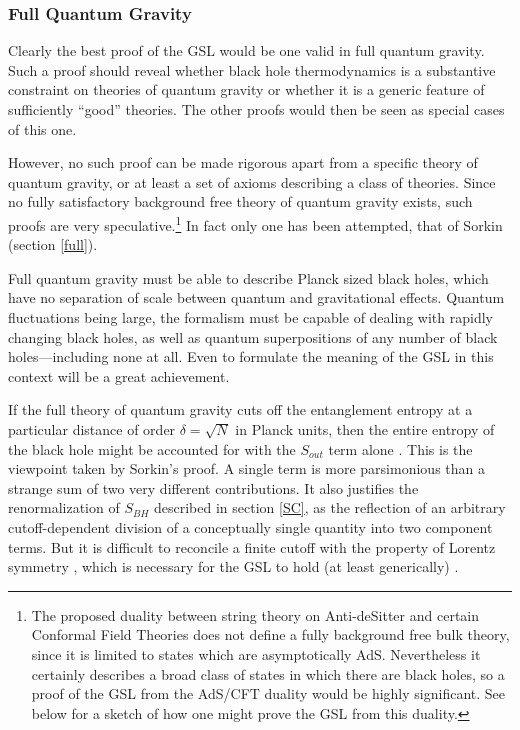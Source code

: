 \documentclass{article}
\begin{document}
\subsubsection{Full Quantum Gravity}\label{QG}

Clearly the best proof of the GSL would be one valid in full quantum gravity.  Such a proof should reveal whether black hole thermodynamics is a substantive constraint on theories of quantum gravity or whether it is a generic feature of sufficiently ``good'' theories.  The other proofs would then be seen as special cases of this one.

However, no such proof can be made rigorous apart from a specific theory of quantum gravity, or at least a set of axioms describing a class of theories.  Since no fully satisfactory background free theory of quantum gravity exists, such proofs are very speculative.\footnote{The proposed duality between string theory on Anti-deSitter and certain Conformal Field Theories \cite{AdS/CFT} does not define a fully background free bulk theory, since it is limited to states which are asymptotically AdS.  Nevertheless it certainly describes a broad class of states in which there are black holes, so a proof of the GSL from the AdS/CFT duality would be highly significant.  See below for a sketch of how one might prove the GSL from this duality.}  In fact only one has been attempted, that of Sorkin \cite{sorkin86} (section \ref{full}).

Full quantum gravity must be able to describe Planck sized black holes, which have no separation of scale between quantum and gravitational effects.  Quantum fluctuations being large, the formalism must be capable of dealing with rapidly changing black holes, as well as quantum superpositions of any number of black holes---including none at all.  Even to formulate the meaning of the GSL in this context will be a great achievement.

If the full theory of quantum gravity cuts off the entanglement entropy at a particular distance of order $\delta = \sqrt{N}$ in Planck units, then the entire entropy of the black hole might be accounted for with the $S_{out}$ term alone \cite{sorkin83}\cite{jacobson94}.  This is the viewpoint taken by Sorkin's proof.  A single term is more parsimonious than a strange sum of two very different contributions.  It also justifies the renormalization of $S_{BH}$ described in section \ref{SC}, as the reflection of an arbitrary cutoff-dependent division of a conceptually single quantity into two component terms.  But it is difficult to reconcile a finite cutoff with the property of Lorentz symmetry \cite{jacobson00}, which is necessary for the GSL to hold (at least generically) \cite{EFJW07}.
\end{document}
